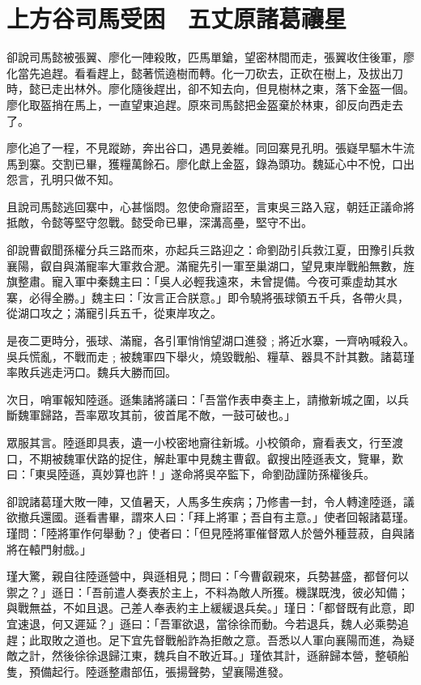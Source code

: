 
\chapter{上方谷司馬受困　五丈原諸葛禳星}

卻說司馬懿被張翼、廖化一陣殺敗，匹馬單鎗，望密林間而走，張翼收住後軍，廖化當先追趕。看看趕上，懿著慌遶樹而轉。化一刀砍去，正砍在樹上，及拔出刀時，懿已走出林外。廖化隨後趕出，卻不知去向，但見樹林之東，落下金盔一個。廖化取盔捎在馬上，一直望東追趕。原來司馬懿把金盔棄於林東，卻反向西走去了。

廖化追了一程，不見蹤跡，奔出谷口，遇見姜維。同回寨見孔明。張嶷早驅木牛流馬到寨。交割已畢，獲糧萬餘石。廖化獻上金盔，錄為頭功。魏延心中不悅，口出怨言，孔明只做不知。

且說司馬懿逃回寨中，心甚惱悶。忽使命齎詔至，言東吳三路入寇，朝廷正議命將抵敵，令懿等堅守忽戰。懿受命已畢，深溝高壘，堅守不出。

卻說曹叡聞孫權分兵三路而來，亦起兵三路迎之：命劉劭引兵救江夏，田豫引兵救襄陽，叡自與滿寵率大軍救合淝。滿寵先引一軍至巢湖口，望見東岸戰船無數，旌旗整肅。寵入軍中秦魏主曰：「吳人必輕我遠來，未曾提備。今夜可乘虛劫其水寨，必得全勝。」魏主曰：「汝言正合朕意。」即令驍將張球領五千兵，各帶火具，從湖口攻之；滿寵引兵五千，從東岸攻之。

是夜二更時分，張球、滿寵，各引軍悄悄望湖口進發﹔將近水寨，一齊吶喊殺入。吳兵慌亂，不戰而走﹔被魏軍四下舉火，燒毀戰船、糧草、器具不計其數。諸葛瑾率敗兵逃走沔口。魏兵大勝而回。

次日，哨軍報知陸遜。遜集諸將議曰：「吾當作表申奏主上，請撤新城之圍，以兵斷魏軍歸路，吾率眾攻其前，彼首尾不敵，一鼓可破也。」

眾服其言。陸遜即具表，遺一小校密地齎往新城。小校領命，齎看表文，行至渡口，不期被魏軍伏路的捉住，解赴軍中見魏主曹叡。叡搜出陸遜表文，覽畢，歎曰：「東吳陸遜，真妙算也許！」遂命將吳卒監下，命劉劭謹防孫權後兵。

卻說諸葛瑾大敗一陣，又值暑天，人馬多生疾病；乃修書一封，令人轉達陸遜，議欲撤兵還國。遜看書畢，謂來人曰：「拜上將軍；吾自有主意。」使者回報諸葛瑾。瑾問：「陸將軍作何舉動？」使者曰：「但見陸將軍催督眾人於營外種荳菽，自與諸將在轅門射戲。」

瑾大驚，親自往陸遜營中，與遜相見；問曰：「今曹叡親來，兵勢甚盛，都督何以禦之？」遜日：「吾前遣人奏表於主上，不料為敵人所獲。機謀既洩，彼必知備；與戰無益，不如且退。己差人奉表約主上緩緩退兵矣。」瑾日：「都督既有此意，即宜速退，何又遲延？」遜曰：「吾軍欲退，當徐徐而動。今若退兵，魏人必乘勢追趕；此取敗之道也。足下宜先督戰船詐為拒敵之意。吾悉以人軍向襄陽而進，為疑敵之計，然後徐徐退歸江東，魏兵自不敢近耳。」瑾依其計，遜辭歸本營，整頓船隻，預備起行。陸遜整肅部伍，張揚聲勢，望襄陽進發。

